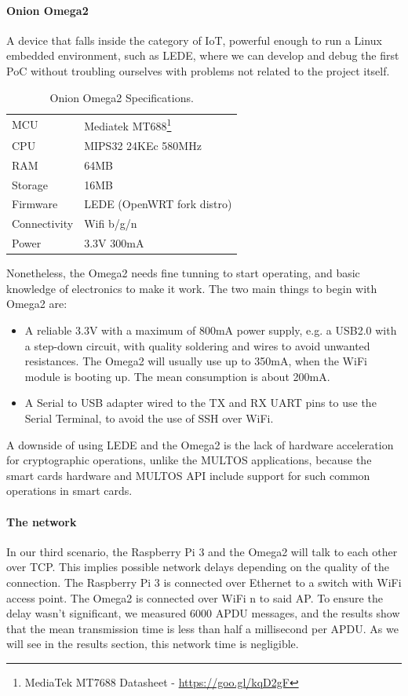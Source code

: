 \documentclass[journal]{IEEEtran}
\begin{document}
\paragraph{Onion Omega2} A device that falls inside the category of IoT, powerful enough to run a Linux embedded environment, such as LEDE, where we can develop and debug the first PoC without troubling ourselves with problems not related to the project itself.


\begin{table}[h]
	\myfloatalign
	\begin{tabular}{ll} \toprule
		MCU & Mediatek MT688\footnote{MediaTek MT7688 Datasheet - \url{https://goo.gl/kqD2gF}} \\
		CPU & MIPS32 24KEc 580MHz \\
		RAM & 64MB \\
		Storage & 16MB \\
		Firmware & LEDE (OpenWRT fork distro) \\
		Connectivity & Wifi b/g/n \\
		Power & 3.3V 300mA \\
		\bottomrule
	\end{tabular}
	\caption[Onion Omega 2 Specifications]{Onion Omega2 Specifications.}
	\label{tab:Omega2Specs}
\end{table}



Nonetheless, the Omega2 needs fine tunning to start operating, and basic knowledge of electronics to make it work. The two main things to begin with Omega2 are:
\begin{itemize}
	\item A reliable 3.3V with a maximum of 800mA power supply, e.g. a USB2.0 with a step-down circuit, with quality soldering and wires to avoid unwanted resistances. The Omega2 will usually use up to 350mA, when the WiFi module is booting up. The mean consumption is about 200mA.
	\item A Serial to USB adapter wired to the TX and RX UART pins to use the Serial Terminal, to avoid the use of SSH over WiFi.
\end{itemize}

A downside of using LEDE and the Omega2 is the lack of hardware acceleration for cryptographic operations, unlike the MULTOS applications, because the smart cards hardware and MULTOS API include support for such common operations in smart cards.



\paragraph{The network} In our third scenario, the Raspberry Pi 3 and the Omega2 will talk to each other over TCP. This implies possible network delays depending on the quality of the connection. The Raspberry Pi 3 is connected over Ethernet to a switch with WiFi access point. The Omega2 is connected over WiFi n to said AP. To ensure the delay wasn't significant, we measured 6000 APDU messages, and the results show that the mean transmission time is less than half a millisecond per APDU. As we will see in the results section, this network time is negligible.
\end{document}
